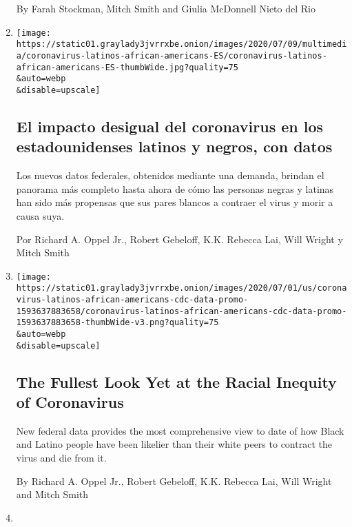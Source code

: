 \begin{enumerate}
  By Farah Stockman, Mitch Smith and Giulia McDonnell Nieto del Rio
\item
  \href{/es/interactive/2020/07/09/espanol/mundo/coronavirus-latinos-africanoamericanos-datos.html}{}

  \texttt{[image: https://static01.graylady3jvrrxbe.onion/images/2020/07/09/multimedia/coronavirus-latinos-african-americans-ES/coronavirus-latinos-african-americans-ES-thumbWide.jpg?quality=75\\\&auto=webp\\\&disable=upscale]}

  \hypertarget{el-impacto-desigual-del-coronavirus-en-los-estadounidenses-latinos-y-negros-con-datos}{%
  \subsection{El impacto desigual del coronavirus en los estadounidenses
  latinos y negros, con
  datos}\label{el-impacto-desigual-del-coronavirus-en-los-estadounidenses-latinos-y-negros-con-datos}}

  Los nuevos datos federales, obtenidos mediante una demanda, brindan el
  panorama más completo hasta ahora de cómo las personas negras y
  latinas han sido más propensas que sus pares blancos a contraer el
  virus y morir a causa suya.

  Por Richard A. Oppel Jr., Robert Gebeloff, K.K. Rebecca Lai, Will
  Wright y Mitch Smith
\item
  \href{/interactive/2020/07/05/us/coronavirus-latinos-african-americans-cdc-data.html}{}

  \texttt{[image: https://static01.graylady3jvrrxbe.onion/images/2020/07/01/us/coronavirus-latinos-african-americans-cdc-data-promo-1593637883658/coronavirus-latinos-african-americans-cdc-data-promo-1593637883658-thumbWide-v3.png?quality=75\\\&auto=webp\\\&disable=upscale]}

  \hypertarget{the-fullest-look-yet-at-the-racial-inequity-of-coronavirus}{%
  \subsection{The Fullest Look Yet at the Racial Inequity of
  Coronavirus}\label{the-fullest-look-yet-at-the-racial-inequity-of-coronavirus}}

  New federal data provides the most comprehensive view to date of how
  Black and Latino people have been likelier than their white peers to
  contract the virus and die from it.

  By Richard A. Oppel Jr., Robert Gebeloff, K.K. Rebecca Lai, Will
  Wright and Mitch Smith
\item
  \href{/2020/07/02/us/coronavirus-fourth-of-july.html}{}


\end{enumerate}
